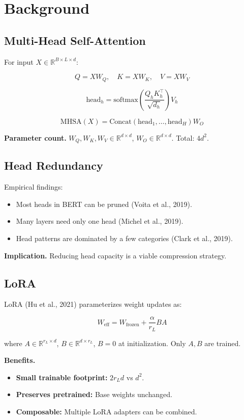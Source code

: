 
\section{Background}

\subsection{Multi-Head Self-Attention}

For input $X \in \mathbb{R}^{B \times L \times d}$:

\[
Q = X W_Q, \quad K = X W_K, \quad V = X W_V
\]

\[
\text{head}_h = \text{softmax}\!\left(\frac{Q_h K_h^\top}{\sqrt{d_h}}\right) V_h
\]

\[
\text{MHSA}(X) = \text{Concat}(\text{head}_1, \dots, \text{head}_H) W_O
\]

\textbf{Parameter count.} $W_Q, W_K, W_V \in \mathbb{R}^{d \times d}$, 
$W_O \in \mathbb{R}^{d \times d}$. Total: $4 d^2$.

\subsection{Head Redundancy}

Empirical findings:

\begin{itemize}
\item Most heads in BERT can be pruned (Voita et al., 2019).
\item Many layers need only one head (Michel et al., 2019).
\item Head patterns are dominated by a few categories (Clark et al., 2019).

\end{itemize}
\textbf{Implication.} Reducing head capacity is a viable compression strategy.

\subsection{LoRA}

LoRA (Hu et al., 2021) parameterizes weight updates as:

\[
W_\text{eff} = W_\text{frozen} + \frac{\alpha}{r_L} B A
\]

where $A \in \mathbb{R}^{r_L \times d}$, $B \in \mathbb{R}^{d \times r_L}$, 
$B = 0$ at initialization. Only $A, B$ are trained.

\textbf{Benefits.}
\begin{itemize}
\item \textbf{Small trainable footprint:} $2 r_L d$ vs $d^2$.
\item \textbf{Preserves pretrained:} Base weights unchanged.
\item \textbf{Composable:} Multiple LoRA adapters can be combined.

\end{itemize}
